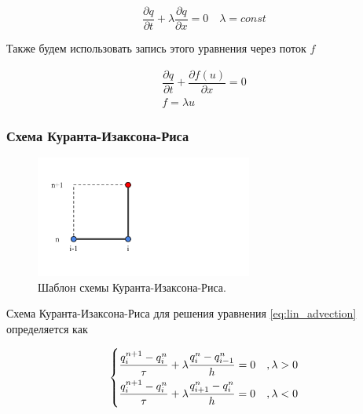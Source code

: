 \begin{equation}
    \dfrac{\partial q}{\partial t} + \lambda \dfrac{\partial q}{\partial x} = 0 \quad \lambda =const
    \label{eq:lin_advection}
\end{equation}

Также будем использовать запись этого уравнения через поток $f$

\begin{equation}
\begin{gathered}
    \dfrac{\partial q}{\partial t} + \dfrac{\partial f (u)}{\partial x} = 0 \\
    f = \lambda u
\end{gathered}
\label{eq:lin_advection_flux}
\end{equation}

\subsubsection{Схема Куранта-Изаксона-Риса}

\begin{figure}[htb]
    \centering
    \includegraphics[trim={55pt 100pt 530pt 100pt},clip,height=4cm]{images/theory/scheme_cir.png}
    \caption{Шаблон схемы Куранта-Изаксона-Риса.}
    \label{fig:scheme_cir}
\end{figure}

Схема Куранта-Изаксона-Риса для решения уравнения \eqref{eq:lin_advection} определяется как \cite{cir_scheme} \cite{petrov_lobanov_book}

\begin{equation}
\begin{dcases}
    \dfrac{q_i^{n+1} - q_i^n}{\tau} + \lambda\dfrac{q_i^n - q_{i-1}^n}{h} = 0 & , \lambda > 0\\
    \dfrac{q_i^{n+1} - q_i^n}{\tau} + \lambda\dfrac{q_{i+1}^n - q_i^n}{h} = 0  & , \lambda < 0
\end{dcases}
\label{eq:cir_scheme}
\end{equation}

